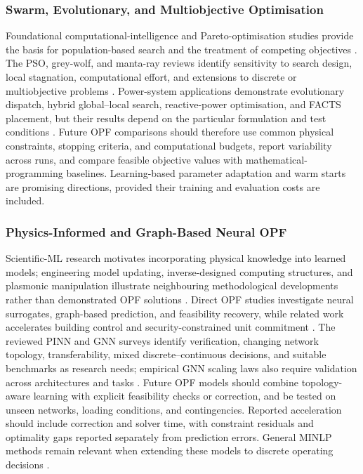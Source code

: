 \documentclass[a4paper,fleqn]{cas-sc}
\begin{document}
    \subsubsection{Swarm, Evolutionary, and Multiobjective Optimisation}\label{subsubsec:gaps_metaheuristics}
    
    Foundational computational-intelligence and Pareto-optimisation studies provide the basis for population-based search and the treatment of competing objectives \cite{opfRef010,opfRef008}. The PSO, grey-wolf, and manta-ray reviews identify sensitivity to search design, local stagnation, computational effort, and extensions to discrete or multiobjective problems \cite{del2008particle,opfRef035,opfRef070,shami2022particle}. Power-system applications demonstrate evolutionary dispatch, hybrid global--local search, reactive-power optimisation, and FACTS placement, but their results depend on the particular formulation and test conditions \cite{opfRef004,opfRef005,opfRef006,opfRef007,opfRef014,opfRef017}. Future OPF comparisons should therefore use common physical constraints, stopping criteria, and computational budgets, report variability across runs, and compare feasible objective values with mathematical-programming baselines. Learning-based parameter adaptation and warm starts are promising directions, provided their training and evaluation costs are included.
    
    \subsubsection{Physics-Informed and Graph-Based Neural OPF}\label{subsubsec:gaps_neural_opf}
    
    Scientific-ML research motivates incorporating physical knowledge into learned models; engineering model updating, inverse-designed computing structures, and plasmonic manipulation illustrate neighbouring methodological developments rather than demonstrated OPF solutions \cite{willard2022integrating,opfRef016,opfRef056,opfRef088}. Direct OPF studies investigate neural surrogates, graph-based prediction, and feasibility recovery, while related work accelerates building control and security-constrained unit commitment \cite{zamzam2020learning,opfRef071,opfRef082,opfRef041,xavier2021learning}. The reviewed PINN and GNN surveys identify verification, changing network topology, transferability, mixed discrete--continuous decisions, and suitable benchmarks as research needs; empirical GNN scaling laws also require validation across architectures and tasks \cite{huang2022applications,liao2021review,zhu2024scaling,farea2024understanding}. Future OPF models should combine topology-aware learning with explicit feasibility checks or correction, and be tested on unseen networks, loading conditions, and contingencies. Reported acceleration should include correction and solver time, with constraint residuals and optimality gaps reported separately from prediction errors. General MINLP methods remain relevant when extending these models to discrete operating decisions \cite{opfRef020}.
    
\end{document}
